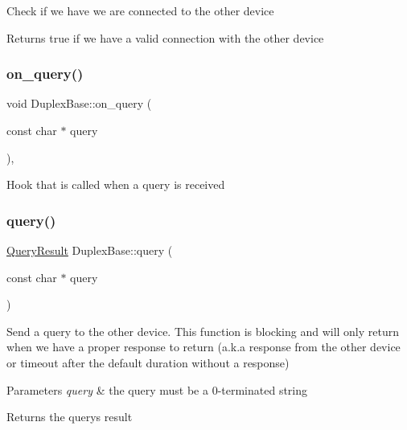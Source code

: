 Check if we have we are connected to the other device

\begin{DoxyReturn}{Returns}
true if we have a valid connection with the other device 
\end{DoxyReturn}
\mbox{\label{classInterQarpe_1_1DuplexBase_a4acc79abc4ff57238ca7efc8eaa30064}} 
\subsubsection{\texorpdfstring{on\+\_\+query()}{on\_query()}}
{\footnotesize\ttfamily void Duplex\+Base\+::on\+\_\+query (\begin{DoxyParamCaption}\item[{const char $\ast$}]{query }\end{DoxyParamCaption})\hspace{0.3cm}{\ttfamily [protected]}, {\ttfamily [virtual]}}

Hook that is called when a query is received \mbox{\label{classInterQarpe_1_1DuplexBase_a1b3a0a47a6f8c3d6a50959484d118a51}} 
\subsubsection{\texorpdfstring{query()}{query()}}
{\footnotesize\ttfamily \hyperlink{classInterQarpe_1_1QueryResult}{Query\+Result} Duplex\+Base\+::query (\begin{DoxyParamCaption}\item[{const char $\ast$}]{query }\end{DoxyParamCaption})}

Send a query to the other device. This function is blocking and will only return when we have a proper response to return (a.\+k.\+a response from the other device or timeout after the default duration without a response)


\begin{DoxyParams}{Parameters}
{\em query} & the query must be a 0-\/terminated string\\
\hline
\end{DoxyParams}
\begin{DoxyReturn}{Returns}
the query\textquotesingle{}s result 
\end{DoxyReturn}
\mbox{\label{classInterQarpe_1_1DuplexBase_a9b9fd5a27079a505aa8f1bcf465efc3c}} 
